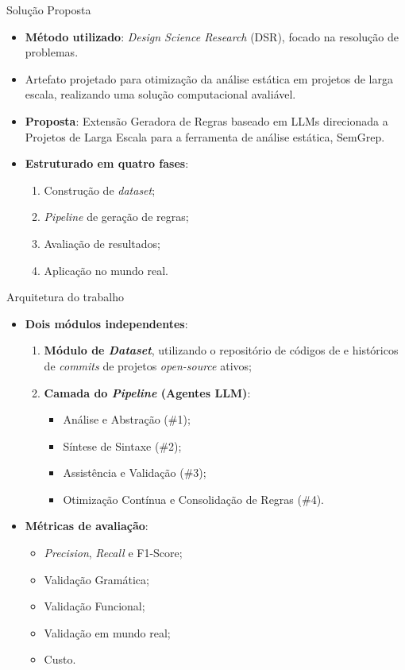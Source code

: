 \documentclass[
    aspectratio=169,   %
    12pt,
    brazil
]{beamer}
\newcommand{\minhaspaginas}{}
\begin{document}
\renewcommand{\minhaspaginas}{\small 45}
\begin{frame}{Solução Proposta}
  \begin{itemize}
    \item \textbf{Método utilizado}: 
      \textit{Design Science Research} (DSR), focado na resolução de problemas.
    \item Artefato projetado para otimização da análise estática em projetos de larga escala, realizando uma solução computacional avaliável.
    \item \textbf{Proposta}:
      Extensão Geradora de Regras baseado em LLMs direcionada a Projetos de Larga Escala para a ferramenta de análise estática, SemGrep.
    \item \textbf{Estruturado em quatro fases}:
      \begin{enumerate}
        \item Construção de \textit{dataset};
        \item \textit{Pipeline} de geração de regras;
        \item Avaliação de resultados;
        \item Aplicação no mundo real.
      \end{enumerate}
  \end{itemize}
\end{frame}

\renewcommand{\minhaspaginas}{\small 45 - 46}
\begin{frame}{Arquitetura do trabalho}
  \begin{itemize}
    \item \textbf{Dois módulos independentes}:
      \begin{enumerate}
        \item \textbf{Módulo de \textit{Dataset}}, utilizando o repositório de códigos de  e históricos de \textit{commits} de projetos \textit{open-source} ativos;
        \item \textbf{Camada do \textit{Pipeline} (Agentes LLM)}:
          \begin{itemize}
            \item Análise e Abstração (\#1);
            \item Síntese de Sintaxe (\#2);
            \item Assistência e Validação (\#3);
            \item Otimização Contínua e Consolidação de Regras (\#4).
          \end{itemize}
      \end{enumerate}
    \item \textbf{Métricas de avaliação}:
      \begin{itemize}
        \item \textit{Precision}, \textit{Recall} e F1-Score;
        \item Validação Gramática;
        \item Validação Funcional;
        \item Validação em mundo real;
        \item Custo.
      \end{itemize}
  \end{itemize}
\end{frame}
\end{document}
